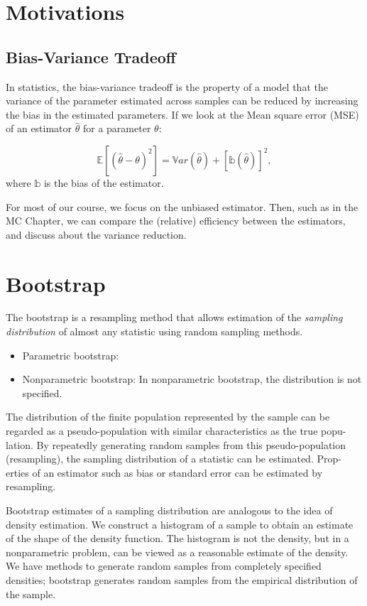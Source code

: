 \documentclass[
  letterpaper,
  DIV=11,
  numbers=noendperiod]{scrreprt}
\begin{document}
\section{Motivations}\label{motivations}

\subsection{Bias-Variance Tradeoff}\label{bias-variance-tradeoff}

In statistics, the bias-variance tradeoff is the property of a model
that the variance of the parameter estimated across samples can be
reduced by increasing the bias in the estimated parameters. If we look
at the Mean square error (MSE) of an estimator \(\hat{\theta}\) for a
parameter \(\theta\):

\[\mathbb{E}[(\hat{\theta}-\theta )^2 ]= \mathbb{V}ar(\hat{\theta}) + [\mathbb{b}(\hat{\theta})]^2,\]
where \(\mathbb{b}\) is the bias of the estimator.

For most of our course, we focus on the unbiased estimator. Then, such
as in the MC Chapter, we can compare the (relative) efficiency between
the estimators, and discuss about the variance reduction.

\section{Bootstrap}\label{bootstrap}

The bootstrap is a resampling method that allows estimation of the
\emph{sampling distribution} of almost any statistic using random
sampling methods.

\begin{itemize}
\item
  Parametric bootstrap:
\item
  Nonparametric bootstrap: In nonparametric bootstrap, the distribution
  is not specified.
\end{itemize}

The distribution of the finite population represented by the sample can
be regarded as a pseudo-population with similar characteristics as the
true popu- lation. By repeatedly generating random samples from this
pseudo-population (resampling), the sampling distribution of a statistic
can be estimated. Prop- erties of an estimator such as bias or standard
error can be estimated by resampling.

Bootstrap estimates of a sampling distribution are analogous to the idea
of density estimation. We construct a histogram of a sample to obtain an
estimate of the shape of the density function. The histogram is not the
density, but in a nonparametric problem, can be viewed as a reasonable
estimate of the density. We have methods to generate random samples from
completely specified densities; bootstrap generates random samples from
the empirical distribution of the sample.
\end{document}
